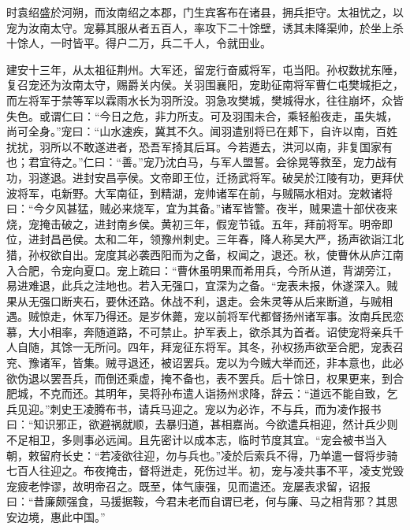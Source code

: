 \documentclass[12pt,UTF8]{ctexbook}
\begin{document}
时袁绍盛於河朔，而汝南绍之本郡，门生宾客布在诸县，拥兵拒守。太祖忧之，以宠为汝南太守。宠募其服从者五百人，率攻下二十馀壁，诱其未降渠帅，於坐上杀十馀人，一时皆平。得户二万，兵二千人，令就田业。

建安十三年，从太祖征荆州。大军还，留宠行奋威将军，屯当阳。孙权数扰东陲，复召宠还为汝南太守，赐爵关内侯。关羽围襄阳，宠助征南将军曹仁屯樊城拒之，而左将军于禁等军以霖雨水长为羽所没。羽急攻樊城，樊城得水，往往崩坏，众皆失色。或谓仁曰：“今日之危，非力所支。可及羽围未合，乘轻船夜走，虽失城，尚可全身。”宠曰：“山水速疾，冀其不久。闻羽遣别将已在郏下，自许以南，百姓扰扰，羽所以不敢遂进者，恐吾军掎其后耳。今若遁去，洪河以南，非复国家有也；君宜待之。”仁曰：“善。”宠乃沈白马，与军人盟誓。会徐晃等救至，宠力战有功，羽遂退。进封安昌亭侯。文帝即王位，迁扬武将军。破吴於江陵有功，更拜伏波将军，屯新野。大军南征，到精湖，宠帅诸军在前，与贼隔水相对。宠敕诸将曰：“今夕风甚猛，贼必来烧军，宜为其备。”诸军皆警。夜半，贼果遣十部伏夜来烧，宠掩击破之，进封南乡侯。黄初三年，假宠节钺。五年，拜前将军。明帝即位，进封昌邑侯。太和二年，领豫州刺史。三年春，降人称吴大严，扬声欲诣江北猎，孙权欲自出。宠度其必袭西阳而为之备，权闻之，退还。秋，使曹休从庐江南入合肥，令宠向夏口。宠上疏曰：“曹休虽明果而希用兵，今所从道，背湖旁江，易进难退，此兵之洼地也。若入无强口，宜深为之备。“宠表未报，休遂深入。贼果从无强口断夹石，要休还路。休战不利，退走。会朱灵等从后来断道，与贼相遇。贼惊走，休军乃得还。是岁休薨，宠以前将军代都督扬州诸军事。汝南兵民恋慕，大小相率，奔随道路，不可禁止。护军表上，欲杀其为首者。诏使宠将亲兵千人自随，其馀一无所问。四年，拜宠征东将军。其冬，孙权扬声欲至合肥，宠表召兖、豫诸军，皆集。贼寻退还，被诏罢兵。宠以为今贼大举而还，非本意也，此必欲伪退以罢吾兵，而倒还乘虚，掩不备也，表不罢兵。后十馀日，权果更来，到合肥城，不克而还。其明年，吴将孙布遣人诣扬州求降，辞云：“道远不能自致，乞兵见迎。”刺史王凌腾布书，请兵马迎之。宠以为必诈，不与兵，而为凌作报书曰：“知识邪正，欲避祸就顺，去暴归道，甚相嘉尚。今欲遣兵相迎，然计兵少则不足相卫，多则事必远闻。且先密计以成本志，临时节度其宜。“宠会被书当入朝，敕留府长史：“若凌欲往迎，勿与兵也。”凌於后索兵不得，乃单遣一督将步骑七百人往迎之。布夜掩击，督将迸走，死伤过半。初，宠与凌共事不平，凌支党毁宠疲老悖谬，故明帝召之。既至，体气康强，见而遣还。宠屡表求留，诏报曰：“昔廉颇强食，马援据鞍，今君未老而自谓已老，何与廉、马之相背邪？其思安边境，惠此中国。”
\end{document}

